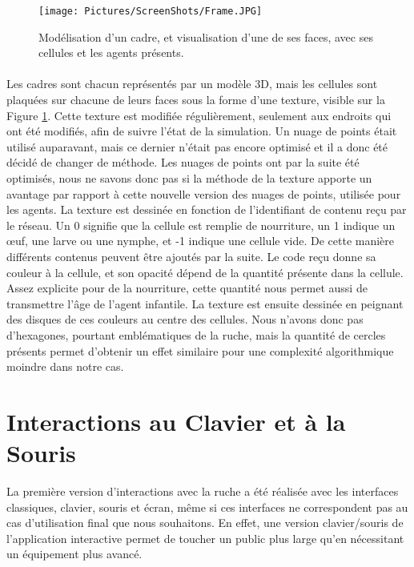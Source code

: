 	\begin{figure}
		\centering
		\texttt{[image: Pictures/ScreenShots/Frame.JPG]}
		\caption{Modélisation d'un cadre, et visualisation d'une de ses faces, avec ses cellules et les agents présents.}
		\label{PicFrame}
	\end{figure}
		
		\paragraph{}
		Les cadres sont chacun représentés par un modèle 3D, mais les cellules sont plaquées sur chacune de leurs faces sous la forme d'une texture, visible sur la Figure \ref{PicFrame}. Cette texture est modifiée régulièrement, seulement aux endroits qui ont été modifiés, afin de suivre l'état de la simulation. Un nuage de points était utilisé auparavant, mais ce dernier n'était pas encore optimisé et il a donc été décidé de changer de méthode. Les nuages de points ont par la suite été optimisés, nous ne savons donc pas si la méthode de la texture apporte un avantage par rapport à cette nouvelle version des nuages de points, utilisée pour les agents. La texture est dessinée en fonction de l'identifiant de contenu reçu par le réseau. Un 0 signifie que la cellule est remplie de nourriture, un 1 indique un œuf, une larve ou une nymphe, et -1 indique une cellule vide. De cette manière différents contenus peuvent être ajoutés par la suite. Le code reçu donne sa couleur à la cellule, et son opacité dépend de la quantité présente dans la cellule. Assez explicite pour de la nourriture, cette quantité nous permet aussi de transmettre l'âge de l'agent infantile. La texture est ensuite dessinée en peignant des disques de ces couleurs au centre des cellules. Nous n'avons donc pas d'hexagones, pourtant emblématiques de la ruche, mais la quantité de cercles présents permet d'obtenir un effet similaire pour une complexité algorithmique moindre dans notre cas.
	
	
	\section{Interactions au Clavier et à la Souris}
		La première version d'interactions avec la ruche a été réalisée avec les interfaces classiques, clavier, souris et écran, même si ces interfaces ne correspondent pas au cas d'utilisation final que nous souhaitons. En effet, une version clavier/souris de l'application interactive permet de toucher un public plus large qu'en nécessitant un équipement plus avancé.
		
